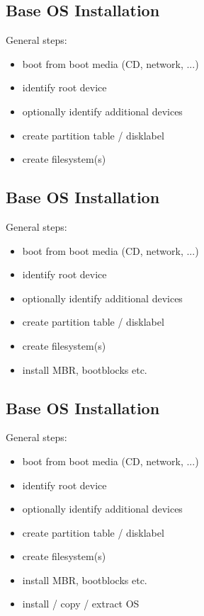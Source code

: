 \documentclass[xga]{xdvislides}
\begin{document}
\subsection{Base OS Installation}
General steps:
\begin{itemize}
	\item boot from boot media (CD, network, ...)
	\item identify root device
	\item optionally identify additional devices
	\item create partition table / disklabel
	\item create filesystem(s)
\end{itemize}

\subsection{Base OS Installation}
General steps:
\begin{itemize}
	\item boot from boot media (CD, network, ...)
	\item identify root device
	\item optionally identify additional devices
	\item create partition table / disklabel
	\item create filesystem(s)
	\item install MBR, bootblocks etc.
\end{itemize}

\subsection{Base OS Installation}
General steps:
\begin{itemize}
	\item boot from boot media (CD, network, ...)
	\item identify root device
	\item optionally identify additional devices
	\item create partition table / disklabel
	\item create filesystem(s)
	\item install MBR, bootblocks etc.
	\item install / copy / extract OS
\end{itemize}
\end{document}
